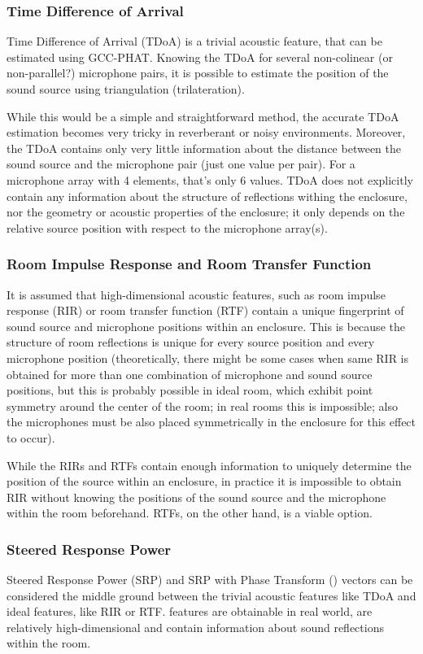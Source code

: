 \documentclass[applsci,article,submit,moreauthors,pdftex]{Definitions/mdpi}
\begin{document}
\subsubsection{Time Difference of Arrival}
Time Difference of Arrival (TDoA) is a trivial acoustic feature, that can be estimated using GCC-PHAT. Knowing the TDoA for several non-colinear (or non-parallel?) microphone pairs, it is possible to estimate the position of the sound source using triangulation (trilateration).

While this would be a simple and straightforward method, the accurate TDoA estimation becomes very tricky in reverberant or noisy environments. Moreover, the TDoA contains only very little information about the distance between the sound source and the microphone pair (just one value per pair). For a microphone array with 4 elements, that's only 6 values. TDoA does not explicitly contain any information about the structure of reflections withing the enclosure, nor the geometry or acoustic properties of the enclosure; it only depends on the relative source position with respect to the microphone array(s).

\subsubsection{Room Impulse Response and Room Transfer Function}
It is assumed that high-dimensional acoustic features, such as room impulse response (RIR) or room transfer function (RTF) contain a unique fingerprint of sound source and microphone positions within an enclosure. This is because the structure of room reflections is unique for every source position and every microphone position (theoretically, there might be some cases when same RIR is obtained for more than one combination of microphone and sound source positions, but this is probably possible in ideal room, which exhibit point symmetry around the center of the room; in real rooms this is impossible; also the microphones must be also placed symmetrically in the enclosure for this effect to occur).

While the RIRs and RTFs contain enough information to uniquely determine the position of the source within an enclosure, in practice it is impossible to obtain RIR without knowing the positions of the sound source and the microphone within the room beforehand. RTFs, on the other hand, is a viable option.

\subsubsection{Steered Response Power}
Steered Response Power (SRP) and SRP with Phase Transform (\srpphat{}) vectors can be considered the middle ground between the trivial acoustic features like TDoA and ideal features, like RIR or RTF. 
\srpphat{} features are obtainable in real world, are relatively high-dimensional and contain information about sound reflections within the room.
\end{document}
